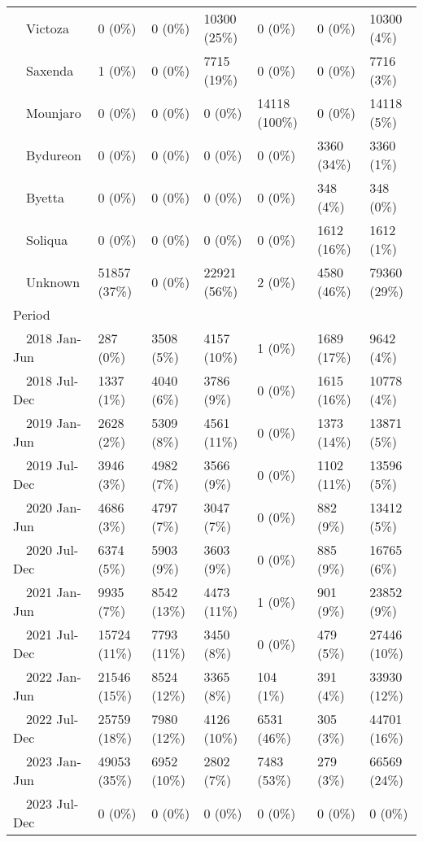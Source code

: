 \begin{longtable}{p{}p{}p{}p{}p{}p{}p{}}
    Victoza & 0 (0\%) & 0 (0\%) & 10300 (25\%) & 0 (0\%) & 0 (0\%) & 10300 (4\%) \\ 
    Saxenda & 1 (0\%) & 0 (0\%) & 7715 (19\%) & 0 (0\%) & 0 (0\%) & 7716 (3\%) \\ 
    Mounjaro & 0 (0\%) & 0 (0\%) & 0 (0\%) & 14118 (100\%) & 0 (0\%) & 14118 (5\%) \\ 
    Bydureon & 0 (0\%) & 0 (0\%) & 0 (0\%) & 0 (0\%) & 3360 (34\%) & 3360 (1\%) \\ 
    Byetta & 0 (0\%) & 0 (0\%) & 0 (0\%) & 0 (0\%) & 348 (4\%) & 348 (0\%) \\ 
    Soliqua & 0 (0\%) & 0 (0\%) & 0 (0\%) & 0 (0\%) & 1612 (16\%) & 1612 (1\%) \\ 
    Unknown & 51857 (37\%) & 0 (0\%) & 22921 (56\%) & 2 (0\%) & 4580 (46\%) & 79360 (29\%) \\ 
  Period &  &  &  &  &  &  \\ 
    2018 Jan-Jun & 287 (0\%) & 3508 (5\%) & 4157 (10\%) & 1 (0\%) & 1689 (17\%) & 9642 (4\%) \\ 
    2018 Jul-Dec & 1337 (1\%) & 4040 (6\%) & 3786 (9\%) & 0 (0\%) & 1615 (16\%) & 10778 (4\%) \\ 
    2019 Jan-Jun & 2628 (2\%) & 5309 (8\%) & 4561 (11\%) & 0 (0\%) & 1373 (14\%) & 13871 (5\%) \\ 
    2019 Jul-Dec & 3946 (3\%) & 4982 (7\%) & 3566 (9\%) & 0 (0\%) & 1102 (11\%) & 13596 (5\%) \\ 
    2020 Jan-Jun & 4686 (3\%) & 4797 (7\%) & 3047 (7\%) & 0 (0\%) & 882 (9\%) & 13412 (5\%) \\ 
    2020 Jul-Dec & 6374 (5\%) & 5903 (9\%) & 3603 (9\%) & 0 (0\%) & 885 (9\%) & 16765 (6\%) \\ 
    2021 Jan-Jun & 9935 (7\%) & 8542 (13\%) & 4473 (11\%) & 1 (0\%) & 901 (9\%) & 23852 (9\%) \\ 
    2021 Jul-Dec & 15724 (11\%) & 7793 (11\%) & 3450 (8\%) & 0 (0\%) & 479 (5\%) & 27446 (10\%) \\ 
    2022 Jan-Jun & 21546 (15\%) & 8524 (12\%) & 3365 (8\%) & 104 (1\%) & 391 (4\%) & 33930 (12\%) \\ 
    2022 Jul-Dec & 25759 (18\%) & 7980 (12\%) & 4126 (10\%) & 6531 (46\%) & 305 (3\%) & 44701 (16\%) \\ 
    2023 Jan-Jun & 49053 (35\%) & 6952 (10\%) & 2802 (7\%) & 7483 (53\%) & 279 (3\%) & 66569 (24\%) \\ 
    2023 Jul-Dec & 0 (0\%) & 0 (0\%) & 0 (0\%) & 0 (0\%) & 0 (0\%) & 0 (0\%) \\ 

\end{longtable}
